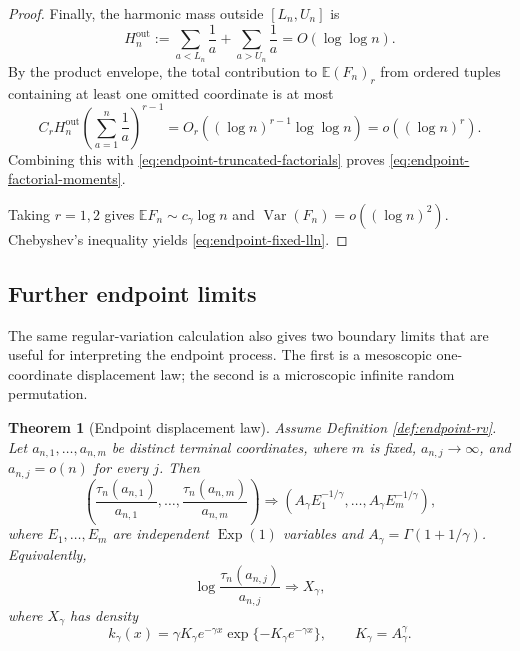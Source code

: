 \documentclass[11pt]{article}
\newtheorem{theorem}{Theorem}[section]
\theoremstyle{remark}
\newcommand{\Ee}{\mathbb E}
\newcommand{\Exp}{\operatorname{Exp}}
\newcommand{\Var}{\operatorname{Var}}
\begin{document}
\begin{proof}
Finally, the harmonic mass outside \([L_n,U_n]\) is
\[
        H_n^{\mathrm{out}}
        :=\sum_{a<L_n}\frac1a+
          \sum_{a>U_n}\frac1a
        =O(\log\log n).
\]
By the product envelope, the total contribution to \(\Ee(F_n)_r\) from
ordered tuples containing at least one omitted coordinate is at most
\[
        C_rH_n^{\mathrm{out}}
        \left(\sum_{a=1}^n\frac1a\right)^{r-1}
        =O_r((\log n)^{r-1}\log\log n)
        =o((\log n)^r).
\]
Combining this with \eqref{eq:endpoint-truncated-factorials} proves
\eqref{eq:endpoint-factorial-moments}.

Taking \(r=1,2\) gives
\(\Ee F_n\sim c_\gamma\log n\) and
\(\Var(F_n)=o((\log n)^2)\).  Chebyshev's inequality yields
\eqref{eq:endpoint-fixed-lln}.
\end{proof}


\subsection{Further endpoint limits}

The same regular-variation calculation also gives two boundary limits that are
useful for interpreting the endpoint process.  The first is a mesoscopic
one-coordinate displacement law; the second is a microscopic infinite random
permutation.

\begin{theorem}[Endpoint displacement law]\label{thm:endpoint-displacement}
Assume Definition \ref{def:endpoint-rv}.  Let
$a_{n,1},\ldots,a_{n,m}$ be distinct terminal coordinates, where $m$ is fixed,
$a_{n,j}\to\infty$, and $a_{n,j}=o(n)$ for every $j$.  Then
\[
        \left(\frac{\tau_n(a_{n,1})}{a_{n,1}},\ldots,
        \frac{\tau_n(a_{n,m})}{a_{n,m}}\right)
        \Rightarrow
        \left(A_\gamma E_1^{-1/\gamma},\ldots,
        A_\gamma E_m^{-1/\gamma}\right),
\]
where $E_1,\ldots,E_m$ are independent $\Exp(1)$ variables and
$A_\gamma=\Gamma(1+1/\gamma)$.  Equivalently,
\[
        \log\frac{\tau_n(a_{n,j})}{a_{n,j}}
        \Rightarrow X_\gamma,
\]
where $X_\gamma$ has density
\[
        k_\gamma(x)=\gamma K_\gamma e^{-\gamma x}
        \exp\{-K_\gamma e^{-\gamma x}\},
        \qquad K_\gamma=A_\gamma^\gamma.
\]
\end{theorem}
\end{document}
